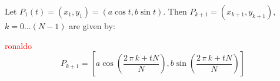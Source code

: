 Let $P_1(t)=(x_1,y_1)=(a\cos{t},b\sin{t})$. Then $P_{k+1}=(x_{k+1},y_{k+1})$, $k=0...(N-1)$ are given by:

\textcolor{red}{ronaldo}
\[ P_{k+1}=\left[a\cos \left( {\frac {2\,\pi\,k+tN}{N}} \right) ,b\sin \left( {\frac {
2\,\pi\,k+tN}{N}} \right) \right]
\]
